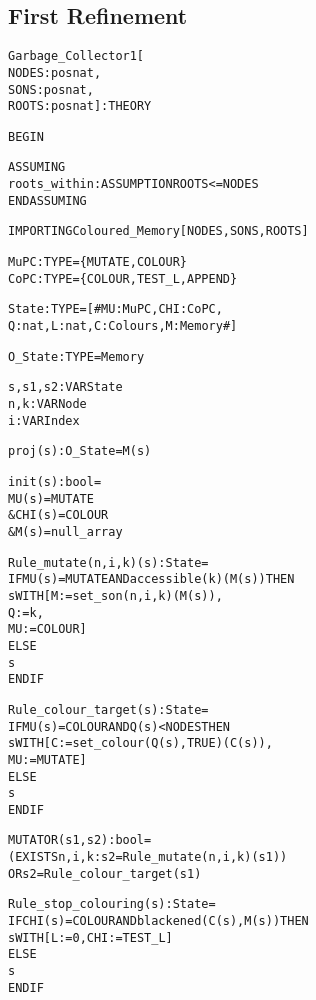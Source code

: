 
\newpage
\subsection{First Refinement}

\begin{alltt}
%%%%%%%%%%%%%%%%%%%%%%%%%%%%%%%%%%%%%%%%%%%%%%%%%%%%
% Garbage_Collector1 :                             %
%   The first refinement of the garbage collector. %
%%%%%%%%%%%%%%%%%%%%%%%%%%%%%%%%%%%%%%%%%%%%%%%%%%%%

Garbage_Collector1[
  NODES : posnat, 
  SONS  : posnat, 
  ROOTS : posnat] : THEORY

BEGIN

  ASSUMING
    roots_within : ASSUMPTION ROOTS <= NODES
  ENDASSUMING

  IMPORTING Coloured_Memory[NODES,SONS,ROOTS]

  MuPC    : TYPE = \{MUTATE,COLOUR\}  
  CoPC    : TYPE = \{COLOUR,TEST_L,APPEND\}

  State   : TYPE = [# MU : MuPC, CHI : CoPC, 
                      Q : nat, L : nat , C : Colours, M : Memory #]

  O_State : TYPE = Memory

  s,s1,s2 : VAR State
  n,k     : VAR Node
  i       : VAR Index

  proj(s):O_State = M(s)

  init(s):bool = 
      MU(s) = MUTATE
    & CHI(s) = COLOUR 
    & M(s) = null_array


  %%%%%%%%%%%%%%%%%%%%%%%
  % The MUTATOR Process %
  %%%%%%%%%%%%%%%%%%%%%%%

  Rule_mutate(n,i,k)(s):State =
    IF MU(s) = MUTATE AND accessible(k)(M(s)) THEN 
      s WITH [M := set_son(n,i,k)(M(s)),
              Q := k,
              MU := COLOUR]
    ELSE 
      s
    ENDIF

  Rule_colour_target(s):State =
    IF MU(s) = COLOUR AND Q(s) < NODES THEN 
      s WITH [C := set_colour(Q(s),TRUE)(C(s)),
              MU := MUTATE]
    ELSE 
      s
    ENDIF

  MUTATOR(s1,s2):bool =
       (EXISTS n,i,k: s2 = Rule_mutate(n,i,k)(s1))
    OR s2 = Rule_colour_target(s1)


  %%%%%%%%%%%%%%%%%%%%%%%%%
  % The COLLECTOR Process %
  %%%%%%%%%%%%%%%%%%%%%%%%%

  Rule_stop_colouring(s):State =
    IF CHI(s) = COLOUR AND blackened(C(s),M(s)) THEN
      s WITH [L := 0, CHI := TEST_L]
    ELSE
      s
    ENDIF


\end{alltt}
